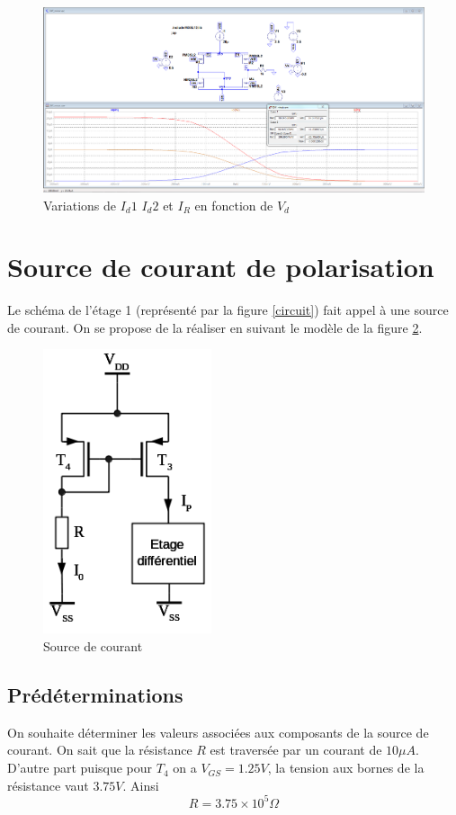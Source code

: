 \documentclass[french]{article}
\begin{document}
\begin{figure}[h!]
\includegraphics[width=\textwidth]{images/gmPincementLevel2.PNG}
\caption{Variations de $I_d1$ $I_d2$ et $I_R$ en fonction de $V_d$}
\label{transcond}
\end{figure}

\section{ Source de courant de polarisation}

Le schéma de l'étage 1 (représenté par la figure \ref{circuit}) fait appel à une source de courant. On se propose de la réaliser en suivant le modèle de la figure \ref{fig:sourceCourant}.

\begin{figure}[h!]
	\centering
	\includegraphics[height=0.25\textheight]{images/sourceCourant.png}
	\caption{Source de courant}
	\label{fig:sourceCourant}
\end{figure}


\subsection{ Prédéterminations}
On souhaite déterminer les valeurs associées aux composants de la source de courant. On sait que la résistance $R$ est traversée par un courant de $10 \mu A$. D'autre part puisque pour $T_4$ on a $V_{GS} = 1.25 V$, la tension aux bornes de la résistance vaut $3.75 V$. Ainsi
\[
\boxed{R = 3.75 \times 10 ^ {5} \Omega}
\]
\end{document}
